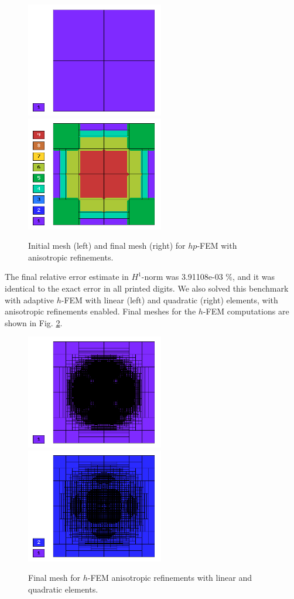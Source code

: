 \begin{figure}[!ht]
\centering
\includegraphics[height=5cm]{nist/nist-1/mesh_hp_aniso_init.png}\ \
\includegraphics[height=5cm]{nist/nist-1/mesh_hp_aniso.png}
\vspace{-2mm}
\caption{Initial mesh (left) and final mesh (right) for $hp$-FEM with anisotropic refinements.}
\label{fig:nist-1-hp-aniso}
\end{figure}

The final relative error estimate in $H^1$-norm was 3.91108e-03 \%,
and it was identical to the exact error in all printed digits.
We also solved this benchmark with adaptive $h$-FEM
with linear (left) and quadratic (right)
elements, with anisotropic refinements enabled.
Final meshes for the $h$-FEM computations are shown
in Fig. \ref{fig:nist-1-h-aniso}.

\begin{figure}[!ht]
\centering
\includegraphics[height=5cm]{nist/nist-1/mesh_h1_aniso.png}\ \
\includegraphics[height=5cm]{nist/nist-1/mesh_h2_aniso.png}
\vspace{-2mm}
\caption{Final mesh for $h$-FEM anisotropic refinements with linear and quadratic elements.}
\label{fig:nist-1-h-aniso}
\end{figure}

